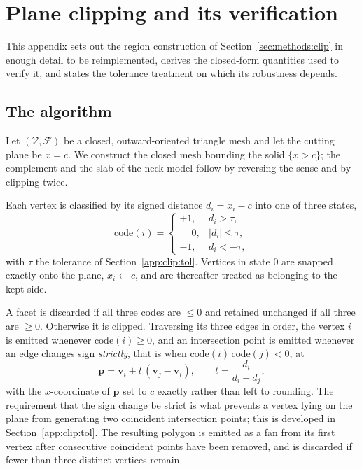 \section{Plane clipping and its verification}
\label{app:clip}

This appendix sets out the region construction of
Section~\ref{sec:methods:clip} in enough detail to be reimplemented, derives
the closed-form quantities used to verify it, and states the tolerance
treatment on which its robustness depends.

\subsection{The algorithm}
\label{app:clip:alg}

Let $(\mathcal{V},\mathcal{F})$ be a closed, outward-oriented triangle mesh and
let the cutting plane be $x = c$. We construct the closed mesh bounding the
solid $\{x > c\}$; the complement and the slab of the neck model follow by
reversing the sense and by clipping twice.

Each vertex is classified by its signed distance $d_i = x_i - c$ into one of
three states,
\begin{equation}
\mathrm{code}(i) =
\begin{cases}
+1, & d_i > \tau, \\
\phantom{+}0, & |d_i| \le \tau, \\
-1, & d_i < -\tau,
\end{cases}
\label{eq:appclassify}
\end{equation}
with $\tau$ the tolerance of Section~\ref{app:clip:tol}. Vertices in state $0$
are snapped exactly onto the plane, $x_i \leftarrow c$, and are thereafter
treated as belonging to the kept side.

A facet is discarded if all three codes are $\le 0$ and retained unchanged if
all three are $\ge 0$. Otherwise it is clipped. Traversing its three edges in
order, the vertex $i$ is emitted whenever $\mathrm{code}(i) \ge 0$, and an
intersection point is emitted whenever an edge changes sign \emph{strictly},
that is when $\mathrm{code}(i)\,\mathrm{code}(j) < 0$, at
\begin{equation}
\mathbf{p} = \mathbf{v}_i + t\,(\mathbf{v}_j - \mathbf{v}_i),
\qquad
t = \frac{d_i}{d_i - d_j},
\label{eq:appintersect}
\end{equation}
with the $x$-coordinate of $\mathbf{p}$ set to $c$ exactly rather than left to
rounding. The requirement that the sign change be strict is what prevents a
vertex lying on the plane from generating two coincident intersection points;
this is developed in Section~\ref{app:clip:tol}. The resulting polygon is
emitted as a fan from its first vertex after consecutive coincident points have
been removed, and is discarded if fewer than three distinct vertices remain.

